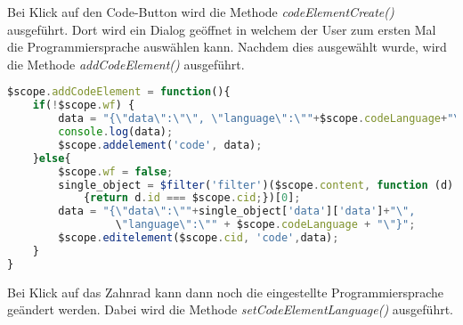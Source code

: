 
Bei Klick auf den Code-Button wird die Methode \textit{codeElementCreate()} ausgeführt. Dort wird ein Dialog geöffnet in welchem der User zum ersten Mal die Programmiersprache auswählen kann. Nachdem dies ausgewählt wurde, wird die Methode \textit{addCodeElement()} ausgeführt.

\begin{lstlisting}[caption={Code-Element Persistierung}, language=Javascript]
$scope.addCodeElement = function(){
    if(!$scope.wf) {
        data = "{\"data\":\"\", \"language\":\""+$scope.codeLanguage+"\"}";
        console.log(data);
        $scope.addelement('code', data);
    }else{
        $scope.wf = false;
        single_object = $filter('filter')($scope.content, function (d) 
        	{return d.id === $scope.cid;})[0];
        data = "{\"data\":\""+single_object['data']['data']+"\",
        		 \"language\":\"" + $scope.codeLanguage + "\"}";
        $scope.editelement($scope.cid, 'code',data);
    }
}
\end{lstlisting}

Bei Klick auf das Zahnrad kann dann noch die eingestellte Programmiersprache geändert werden. Dabei wird die Methode \textit{setCodeElementLanguage()} ausgeführt.
